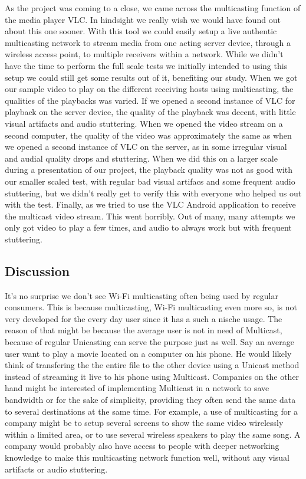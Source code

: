 \documentclass[9pt,a4paper]{acmproc}
\begin{document}
As the project was coming to a close, we came across the multicasting function of the media player VLC. In hindsight we really wish we would have found out about this one sooner. With this tool we could easily setup a live authentic multicasting network to stream media from one acting server device, through a wireless access point, to multiple receivers within a network. While we didn’t have the time to perform the full scale tests we initially intended to using this setup we could still get some results out of it, benefiting our study.
When we got our sample video to play on the different receiving hosts using multicasting, the qualities of the playbacks was varied. If we opened a second instance of VLC for playback on the server device, the quality of the playback was decent, with little visual artifacts and audio stuttering. When we opened the video stream on a second computer, the quality of the video was approximately the same as when we opened a second instance of VLC on the server, as in some irregular visual and audial quality drops and stuttering. When we did this on a larger scale during a presentation of our project, the playback quality was not as good with our smaller scaled test, with regular bad visual artifacs and some frequent audio stuttering, but we didn’t really get to verify this with everyone who helped us out with the test. Finally, as we tried to use the VLC Android application to receive the multicast video stream. This went horribly. Out of many, many attempts we only got video to play a few times, and audio to always work but with frequent stuttering.

\subsection{Discussion}
It’s no surprise we don’t see Wi-Fi multicasting often being used by regular consumers. This is because multicasting, Wi-Fi multicasting even more so, is not very developed for the every day user since it has a such a nische usage. The reason of that might be because the average user is not in need of Multicast, because of regular Unicasting can serve the purpose just as well. Say an average user want to play a movie located on a computer on his phone. He would likely think of transfering the the entire file to the other device using a Unicast method instead of streaming it live to his phone using Multicast.
Companies on the other hand might be interested of implementing Multicast in a network to save bandwidth or for the sake of simplicity, providing they often send the same data to several destinations at the same time. For example, a use of multicasting for a company might be to setup several screens to show the same video wirelessly within a limited area, or to use several wireless speakers to play the same song. A company would probably also have access to people with deeper networking knowledge to make this multicasting network function well, without any visual artifacts or audio stuttering.
\end{document}
